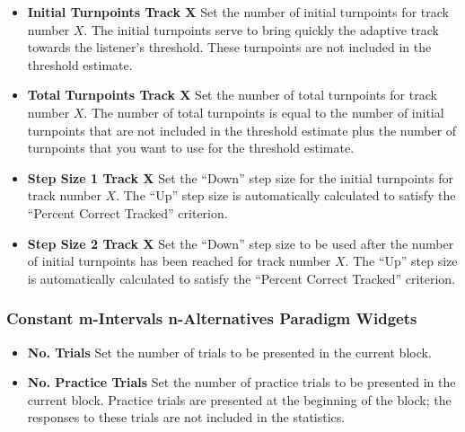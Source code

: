\documentclass[a4paper,12pt,english]{sphinxmanual}
\begin{document}
\begin{itemize}
\item {} 
\textbf{Initial Turnpoints Track X} Set the number of initial turnpoints
for track number $X$. The initial turnpoints serve to bring
quickly the adaptive track towards the listener’s threshold. These
turnpoints are not included in the threshold estimate.

\item {} 
\textbf{Total Turnpoints Track X} Set the number of total turnpoints for
track number $X$. The number of total turnpoints is equal to
the number of initial turnpoints that are not included in the
threshold estimate plus the number of turnpoints that you want to use
for the threshold estimate.

\item {} 
\textbf{Step Size 1 Track X} Set the “Down” step size for the initial
turnpoints for track number $X$. The “Up” step size is
automatically calculated to satisfy the “Percent Correct Tracked”
criterion.

\item {} 
\textbf{Step Size 2 Track X} Set the “Down” step size to be used after the
number of initial turnpoints has been reached for track number
$X$. The “Up” step size is automatically calculated to satisfy
the “Percent Correct Tracked” criterion.

\end{itemize}


\subsubsection{Constant m-Intervals n-Alternatives Paradigm Widgets}
\label{graphical_user_interface:constant-m-intervals-n-alternatives-paradigm-widgets}\begin{itemize}
\item {} 
\textbf{No. Trials} Set the number of trials to be presented in the
current block.

\item {} 
\textbf{No. Practice Trials} Set the number of practice trials to be
presented in the current block. Practice trials are presented at the
beginning of the block; the responses to these trials are not
included in the statistics.

\end{itemize}
\end{document}
